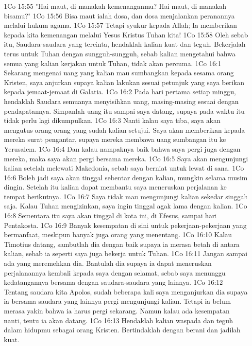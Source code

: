 1Co 15:55  "Hai maut, di manakah kemenanganmu? Hai maut, di manakah bisamu?"
1Co 15:56  Bisa maut ialah dosa, dan dosa menjalankan peranannya melalui hukum agama.
1Co 15:57  Tetapi syukur kepada Allah; Ia memberikan kepada kita kemenangan melalui Yesus Kristus Tuhan kita!
1Co 15:58  Oleh sebab itu, Saudara-saudara yang tercinta, hendaklah kalian kuat dan teguh. Bekerjalah terus untuk Tuhan dengan sungguh-sungguh, sebab kalian mengetahui bahwa semua yang kalian kerjakan untuk Tuhan, tidak akan percuma.
1Co 16:1  Sekarang mengenai uang yang kalian mau sumbangkan kepada sesama orang Kristen, saya anjurkan supaya kalian lakukan sesuai petunjuk yang saya berikan kepada jemaat-jemaat di Galatia.
1Co 16:2  Pada hari pertama setiap minggu, hendaklah Saudara semuanya menyisihkan uang, masing-masing sesuai dengan pendapatannya. Simpanlah uang itu sampai saya datang, supaya pada waktu itu tidak perlu lagi dikumpulkan.
1Co 16:3  Nanti kalau saya tiba, saya akan mengutus orang-orang yang sudah kalian setujui. Saya akan memberikan kepada mereka surat pengantar, supaya mereka membawa uang sumbangan itu ke Yerusalem.
1Co 16:4  Dan kalau nampaknya baik bahwa saya pergi juga dengan mereka, maka saya akan pergi bersama mereka.
1Co 16:5  Saya akan mengunjungi kalian setelah melewati Makedonia, sebab saya berniat untuk lewat di sana.
1Co 16:6  Boleh jadi saya akan tinggal sebentar dengan kalian, mungkin selama musim dingin. Setelah itu kalian dapat membantu saya meneruskan perjalanan ke tempat berikutnya.
1Co 16:7  Saya tidak mau mengunjungi kalian sekedar singgah saja. Kalau Tuhan mengizinkan, saya ingin tinggal agak lama dengan kalian.
1Co 16:8  Sementara itu saya akan tinggal di kota ini, di Efesus, sampai hari Pentakosta.
1Co 16:9  Banyak kesempatan di sini untuk pekerjaan-pekerjaan yang bermanfaat, meskipun banyak juga orang yang menentang.
1Co 16:10  Kalau Timotius datang, sambutlah dia dengan baik supaya ia merasa betah di antara kalian, sebab ia seperti saya juga bekerja untuk Tuhan.
1Co 16:11  Jangan sampai ada yang meremehkan dia. Bantulah dia supaya ia dapat meneruskan perjalanannya kembali kepada saya dengan selamat, sebab saya menunggu kedatangannya bersama dengan saudara-saudara yang lainnya.
1Co 16:12  Tentang saudara kita Apolos, sudah beberapa kali saya menganjurkan dia supaya ia bersama saudara yang lainnya pergi mengunjungi kalian. Tetapi ia belum merasa yakin bahwa ia harus pergi sekarang. Namun kalau ada kesempatan nanti, tentu ia akan datang.
1Co 16:13  Hendaklah kalian waspada dan teguh dalam hidupmu sebagai orang Kristen. Bertindaklah dengan berani dan jadilah kuat.
